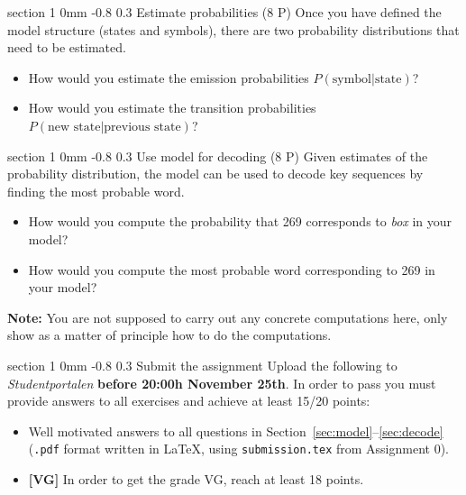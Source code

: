 \documentclass[11pt]{article}
\makeatletter
\newcommand{\newsec}[2]{\section{#1}\label{sec:#2}\noindent}
\renewcommand{\section}{\@startsection
{section}%
{1}%
{0mm}%
{-0.8\baselineskip}%
{0.3\baselineskip}%
{\bfseries\large}}%
\makeatother
\begin{document}
\newsec{Estimate probabilities (8 P)}{estimate}%
Once you have defined the model structure (states and symbols), there are two probability distributions that need to be estimated.
\begin{itemize}[noitemsep,topsep=0.2cm]
\item How would you estimate the emission probabilities $P(\mbox{symbol}|\mbox{state})$?
\item How would you estimate the transition probabilities $P(\mbox{new state}|\mbox{previous state})$?
\end{itemize}

\newsec{Use model for decoding (8 P)}{decode}%
Given estimates of the probability distribution, the model can be used
to decode key sequences by finding the most probable word.
\begin{itemize}[noitemsep,topsep=0.2cm]
\item How would you compute the probability that 269 corresponds to
  {\em box} in your model?
\item How would you compute the most probable word corresponding to
  269 in your model?
\end{itemize}
\textbf{Note:} You are not supposed to carry out any concrete
computations here, only show as a matter of principle how to do the
computations.

\newsec{Submit the assignment}{submit}%
Upload the following to {\it Studentportalen} \textbf{before 20:00h
  November 25th}. In order to pass you must provide answers to all
exercises and achieve at least 15/20 points:
\begin{itemize}[noitemsep,topsep=0.2cm]
\item Well motivated answers to all questions in
  Section~\ref{sec:model}--\ref{sec:decode} (\texttt{.pdf} format
  written in \LaTeX, using \texttt{submission.tex} from Assignment 0).
\item \textbf{[VG]} In order to get the grade VG, reach at least 18
  points.
\end{itemize}
\end{document}
